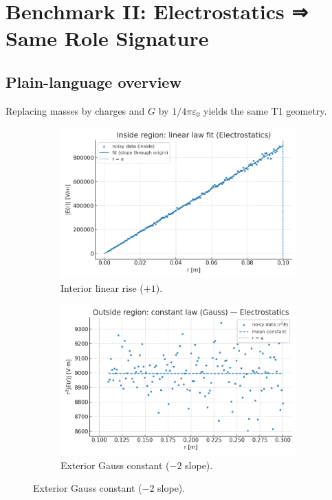 \documentclass[12pt,a4paper,oneside]{scrreprt}
\begin{document}
\chapter{Benchmark II: Electrostatics ⇒ Same Role Signature}
\section*{Plain-language overview}
Replacing masses by charges and $G$ by $1/4\pi\varepsilon_0$ yields the same T1 geometry.

\begin{figure}[htbp]\centering
  \begin{subfigure}[t]{0.49\linewidth}
    \includegraphics[width=\linewidth]{electrostatics_inside_fit.png}
    \caption{Interior linear rise ($+1$).}
    \label{fig:em:inside}
  \end{subfigure}\hfill
  \begin{subfigure}[t]{0.49\linewidth}
    \includegraphics[width=\linewidth]{electrostatics_outside_constant.png}
    \caption{Exterior Gauss constant ($-2$ slope).}
    \label{fig:em:cout}
  \end{subfigure}


\end{figure}
\end{document}
